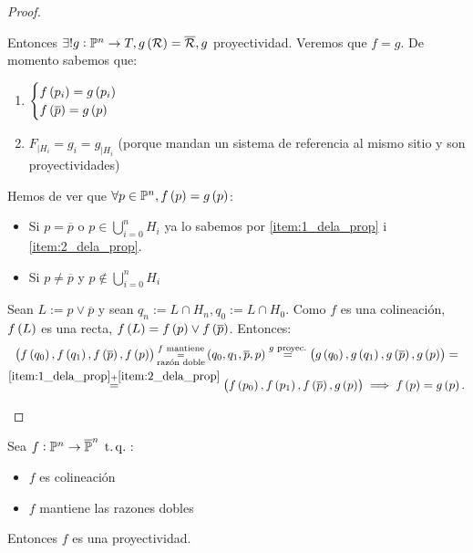 \begin{proof}
\begin{itemize}
		Entonces $\exists! g : \mathbb{P}^n \to T, g \left( \mathcal{R} \right) = \overline{\mathcal{R}}, g$ proyectividad. Veremos que $f = g$.
		De momento sabemos que:
		\begin{enumerate}[(1)]
			\item\label{item:1_dela_prop} $\begin{cases} f \left( p_i \right) = g \left( p_i \right) \\ f \left( \overline{p} \right) = g \left( p \right) \end{cases}$
			\item\label{item:2_dela_prop} $F_{|H_i} = g_i = g_{|H_i}$ (porque mandan un sistema de referencia al mismo sitio y son proyectividades)
		\end{enumerate}
		Hemos de ver que $\forall p \in \mathbb{P}^n, f \left( p \right) = g \left( p \right)$:
		\begin{itemize}
			\item Si $p = \overline{p}$ o $p \in \bigcup_{i=0}^n H_i$ ya lo sabemos por \eqref{item:1_dela_prop} i \eqref{item:2_dela_prop}.
			\item Si $p \neq \overline{p}$ y $p \notin \bigcup_{i=0}^n H_i$
		\end{itemize}
		Sean $L := p \vee \overline{p}$ y sean $q_n := L \cap H_n, q_0 := L \cap H_0$. Como $f$ es una colineación, $f \left( L \right)$ es una recta, $f \left( L \right) = f \left( p \right) \vee f \left( \overline{p} \right)$.
		Entonces:
		\begin{gather*}
			\left( f \left( q_0 \right), f \left( q_1 \right), f \left( \overline{p} \right), f \left( p \right) \right) \substack{f \text{ mantiene} \\ = \\ \text{razón doble}} \left( q_0, q_1, \overline{p}, p \right) \stackrel{g \text{ proyec.}}{=} \left( g \left( q_0 \right), g \left( q_1 \right), g \left( \overline{p} \right), g \left( p \right) \right) = \\
			\stackrel{\eqref{item:1_dela_prop} + \eqref{item:2_dela_prop}}{=} \left( f \left( p_0 \right), f \left( p_1 \right), f \left( \overline{p} \right), g \left( p \right) \right) \implies f \left( p \right) = g \left( p \right).
		\end{gather*}
	\end{itemize}
\end{proof}
\begin{teo} \label{teo:proyectividades}
	Sea $f : \mathbb{P}^n \to \overline{\mathbb{P}}^n \operatorname{\;t.q.\;}$:
	\begin{itemize}
		\item $f$ es colineación
		\item $f$ mantiene las razones dobles
	\end{itemize}
	Entonces $f$ es una proyectividad.
\end{teo}
